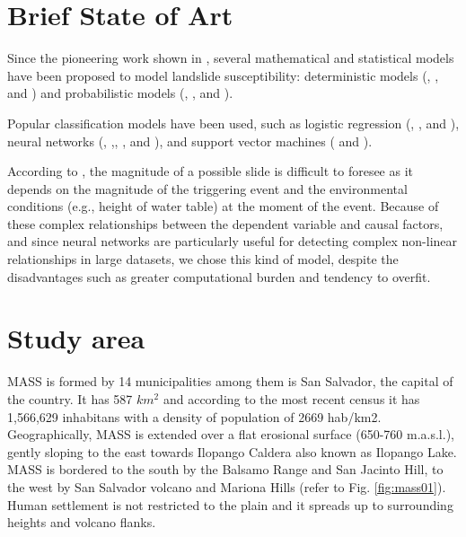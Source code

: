 \documentclass[11pt,twoside]{rmta2010eng}%
\begin{document}
\section{Brief State of Art}
\label{sec:brief}
Since the pioneering work shown in \cite{Carrara1983403}, several mathematical and statistical models have been proposed to model landslide susceptibility: deterministic models (\cite{hessd-10-12643-2013},  \cite{doi:10.1080/19475705.2010.498151}, and \cite{Neu2012511}) and probabilistic models (\cite{Bern198839}, \cite{Chung2003451}, and \cite{doi:10.1080/01431160310001618734}). 

Popular classification models have been used, such as logistic regression (\cite{akgun2012}, \cite{gaskill}, and \cite{garcia2008}), neural networks (\cite{garcia2010}, \cite{Melchiorre2011410},\cite{Zeng2001374}, \cite{Ermini2005327}, and \cite{Yesilnacar2005251}), and support vector machines (\cite{ballabio2012support} and \cite{tien2012landslide}). 


According to \cite{van2006landslide}, the magnitude of a possible
slide is difficult to foresee as it depends on the magnitude of the triggering event and the environmental conditions (e.g., height of water table) at the moment of the event. Because of these complex relationships between the dependent variable and causal factors, and since neural networks are particularly useful for detecting complex non-linear relationships in large datasets, we chose this kind of model, despite the disadvantages such as greater computational burden and tendency to overfit.  



\section{Study area}
\label{sec:studyarea}
MASS is formed by 14 municipalities among them is San Salvador, the capital of the country. It has 587 $km^{2}$ and according to the most recent census \cite{minecon} it has 1,566,629 inhabitans with a density of population of 2669 hab/km2. Geographically, MASS is extended over a flat erosional surface (650-760 m.a.s.l.), gently sloping to the east towards Ilopango Caldera also known as Ilopango Lake. MASS is bordered to the south by the Balsamo Range and San Jacinto Hill, to the west by San Salvador volcano and Mariona Hills (refer to Fig. \ref{fig:mass01}). Human settlement is not restricted to the plain and it spreads up to surrounding heights and volcano flanks.
\end{document}
